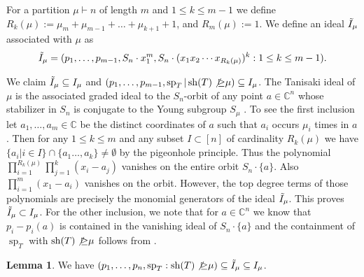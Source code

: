 \documentclass[11pt]{amsart}
\theoremstyle{definition}
\newtheorem{lemma}[theorem]{Lemma}
\newcommand{\CC}{\mathbb{C}}
\DeclareMathOperator{\sh}{sh}
\DeclareMathOperator{\spe}{sp}
\begin{document}
For a partition $\mu \vdash n$ of length $m$ and $1 \leq k \leq m-1$ we define $R_k(\mu):=\mu_m+\mu_{m-1}+\ldots+\mu_{k+1}+1$, and $R_m(\mu) := 1$. We define an ideal $\Tilde{I}_\mu$ associated with $\mu$ as $$\Tilde{I}_\mu = (p_1,\ldots,p_{m-1},S_n \cdot x_1^m,S_n \cdot (x_1x_2\cdots x_{R_k(\mu)})^k : 1 \leq k \leq m-1).$$ 

We claim $\Tilde{I}_\mu \subseteq I_\mu$ and $(p_1,\ldots,p_{m-1},\spe_T | \sh (T) \not \unrhd \mu) \subseteq I_\mu$. The Tanisaki ideal of $\mu$ is the associated graded ideal to the $S_n$-orbit of any point $a \in \CC^n$ whose stabilizer in $S_n$ is conjugate to the Young subgroup $S_\mu$ \cite{GarsiaProcesi1992}. To see the first inclusion let $a_1,\ldots,a_m \in \CC$ be the distinct coordinates of $a$ such that $a_i$ occurs $\mu_i$ times in $a$. Then for any $1 \leq k \leq m$ and any subset $I\subset [n]$ of cardinality $R_k(\mu)$ we have $\{a_i | i \in I\} \cap \{a_1\ldots,a_k\} \neq \emptyset$ by the pigeonhole principle. Thus the polynomial $\prod_{i=1}^{R_k(\mu)}\prod_{j=1}^k(x_i-a_j)$ vanishes on the entire orbit $S_n \cdot \{a\}$. Also $\prod_{i=1}^m(x_1-a_i)$ vanishes on the orbit. However, the top degree terms of those polynomials are precisely the monomial generators of the ideal $\Tilde{I}_\mu$. This proves $\Tilde{I}_\mu \subset I_\mu$.
For the other inclusion, we note that for $a \in \CC^n$ we know that $p_i-p_i(a)$ is contained in the vanishing ideal of $S_n \cdot \{a\}$ and the containment of $\spe_T$ with $\sh(T) \not \unrhd \mu$ follows from \cite[Corollary~1]{moustrou2021symmetric}.

\begin{lemma}
    We have $(p_1,\ldots,p_n,\spe_T : \sh (T) \not \unrhd \mu) \subseteq \Tilde{I}_\mu \subseteq I_\mu$. 
\end{lemma}
\end{document}
